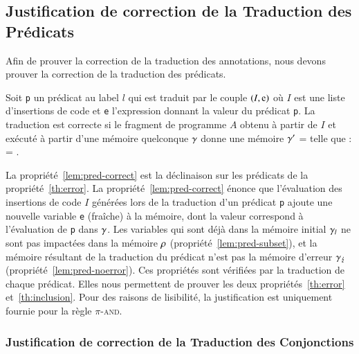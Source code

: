 

\subsection{Justification de correction de la Traduction des Prédicats}
\label{sec:predicate-translation}


Afin de prouver la correction de la traduction des annotations,
nous devons prouver la correction de la traduction des prédicats.

\begin{myproperty}
  \label{lem:pred-correct}
  Soit \lstinline'p' un prédicat au label $l$ qui est
  traduit par le couple $(I, \mbox{\lstinline'e'})$ où $I$ est une liste
  d'insertions de code et \lstinline'e' l'expression donnant la valeur du
  prédicat \lstinline'p'.
  La traduction est correcte si le fragment de programme $A$ obtenu à partir de
  $I$ et exécuté à partir d'une mémoire quelconque $\gamma$ donne une
  mémoire $\gamma'$ =  telle que :
   = .
\end{myproperty}

La propriété~\ref{lem:pred-correct} est la déclinaison sur les prédicats de la
propriété~\ref{th:error}.
La propriété~\ref{lem:pred-correct} énonce que l'évaluation des insertions de
code $I$ générées lors de la traduction d'un prédicat \lstinline'p' ajoute une
nouvelle variable \lstinline'e' (fraîche) à la mémoire, dont la
valeur correspond à l'évaluation de \lstinline'p' dans $\gamma$.
Les variables qui sont déjà dans la mémoire initial $\gamma_l$ ne sont pas
impactées dans la mémoire $\rho$ (propriété~\ref{lem:pred-subset}), et
la mémoire résultant de la traduction du prédicat n'est pas la mémoire
d'erreur $\gamma_\lightning$ (propriété~\ref{lem:pred-noerror}).
Ces propriétés sont vérifiées par la traduction de chaque prédicat.
Elles nous permettent de prouver les deux propriétés~\ref{th:error}
et~\ref{th:inclusion}.
Pour des raisons de lisibilité, la justification est uniquement fournie pour la
règle \textsc{$\pi$-and}.%


\subsubsection{Justification de correction de la Traduction des Conjonctions}

